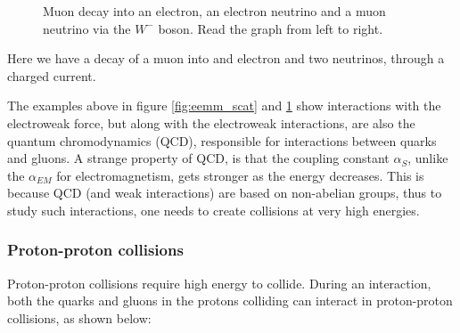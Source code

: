 \begin{figure}[h!]
    \centering
    \caption[Muon decay diagram]{Muon decay into an electron, an electron neutrino and a muon neutrino via the $W^{-}$ boson. Read the graph from left to right.}
    
    \label{fig:mw_decay}
\end{figure}

Here we have a decay of a muon into and electron and two neutrinos, through a charged current. \par 
The examples above in figure \ref{fig:eemm_scat} and \ref{fig:mw_decay} show interactions with 
the electroweak force, but along with the electroweak interactions, are also the quantum chromodynamics (QCD), 
responsible for interactions between quarks and gluons. A strange property of QCD,
is that the coupling constant $\alpha_{S}$, unlike the $\alpha_{EM}$ for electromagnetism,
gets stronger as the energy decreases. This is because QCD (and weak interactions) are based on non-abelian 
groups\cite{Peskin:1995ev}, thus to study such interactions, one needs to create collisions at very high energies. 

\subsubsection*{Proton-proton collisions}
Proton-proton collisions require high energy to collide. During an interaction, both the quarks and gluons
in the protons colliding can interact in proton-proton collisions, as shown below:

